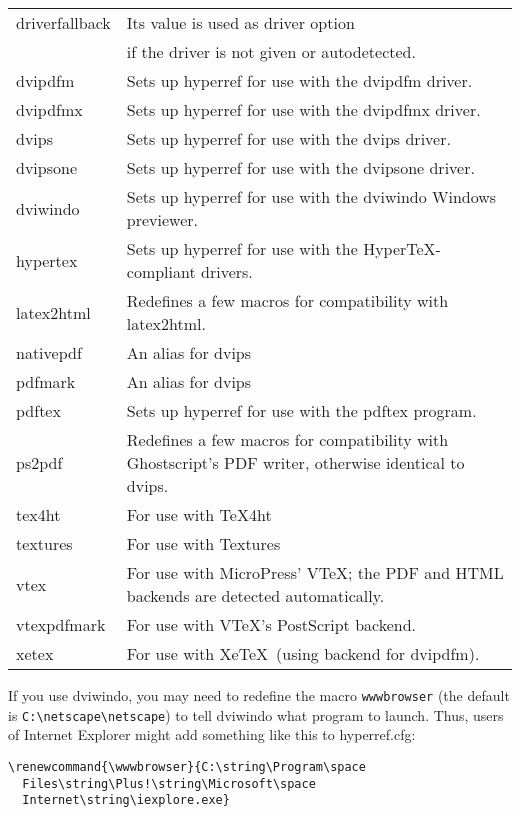 \documentclass{article}
\newcommand{\bs}{\symbol{'134}}%
\newcommand{\ci}[1]{\texttt{\bs#1}}
\begin{document}
\begin{longtable}{@{}>{\ttfamily}lp{.8\hsize}@{}}
driverfallback & Its value is used as driver option\\
            & if the driver is not given or autodetected.\\
dvipdfm     & Sets up \textsf{hyperref} for use with the \textsf{dvipdfm} driver.\\
dvipdfmx    & Sets up \textsf{hyperref} for use with the \textsf{dvipdfmx} driver.\\
dvips       & Sets up \textsf{hyperref} for use with the \textsf{dvips} driver. \\
dvipsone    & Sets up \textsf{hyperref} for use with the \textsf{dvipsone} driver. \\
dviwindo    & Sets up \textsf{hyperref} for use with the \textsf{dviwindo} Windows previewer. \\
hypertex    & Sets up \textsf{hyperref} for use with the Hyper\TeX-compliant drivers. \\
latex2html  & Redefines a few macros for compatibility with \textsf{latex2html}. \\
nativepdf   & An alias for \textsf{dvips} \\
pdfmark     & An alias for \textsf{dvips} \\
pdftex      & Sets up \textsf{hyperref} for use with the \textsf{pdftex} program.\\
ps2pdf      & Redefines a few macros for compatibility with
              Ghostscript's PDF writer, otherwise identical to
              \textsf{dvips}. \\
tex4ht      & For use with \textsf{\TeX4ht} \\
textures    & For use with \textsf{Textures} \\
vtex        & For use with MicroPress' \textsf{VTeX}; the PDF
                       and HTML backends are detected automatically. \\
vtexpdfmark & For use with \textsf{VTeX}'s PostScript backend. \\
xetex       & For use with Xe\TeX\ (using backend for dvipdfm).
\end{longtable}
\smallskip

If you use \textsf{dviwindo}, you may need to redefine the macro
\ci{wwwbrowser} (the default is \verb|C:\netscape\netscape|) to tell
\textsf{dviwindo} what program to launch. Thus, users of Internet
Explorer might add something like this to hyperref.cfg:

\begin{verbatim}
\renewcommand{\wwwbrowser}{C:\string\Program\space
  Files\string\Plus!\string\Microsoft\space
  Internet\string\iexplore.exe}
\end{verbatim}
\end{document}
